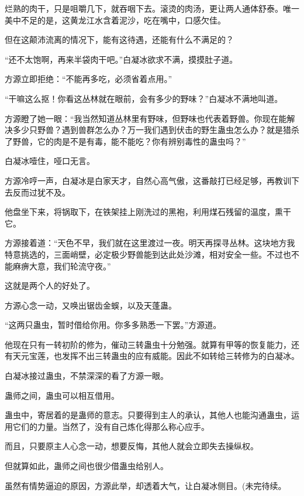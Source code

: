 \begin{this_body}
烂熟的肉干，只是咀嚼几下，就吞咽下去。滚烫的肉汤，更让两人通体舒泰。唯一美中不足的是，这黄龙江水含着泥沙，吃在嘴中，口感欠佳。

但在这颠沛流离的情况下，能有这待遇，还能有什么不满足的？

“还不太饱啊，再来半袋肉干吧。”白凝冰欲求不满，摸摸肚子道。

方源立即拒绝：“不能再多吃，必须省着点用。”

“干嘛这么抠！你看这丛林就在眼前，会有多少的野味？”白凝冰不满地叫道。

方源瞪了她一眼：“我当然知道丛林里有野味，但野味也代表着野兽。你现在能解决多少只野兽？遇到兽群怎么办？万一我们遇到伏击的野生蛊虫怎么办？就是猎杀了野兽，它的肉是不是有毒，能不能吃？你有辨别毒性的蛊虫吗？”

白凝冰噎住，哑口无言。

方源冷哼一声，白凝冰是白家天才，自然心高气傲，这番敲打已经足够，再教训下去反而过犹不及。

他盘坐下来，将锅取下，在铁架挂上刚洗过的黑袍，利用煤石残留的温度，熏干它。

方源接着道：“天色不早，我们就在这里渡过一夜。明天再探寻丛林。这块地方我特意挑选的，三面峭壁，必定极少野兽能到达此处沙滩，相对安全一些。不过也不能麻痹大意，我们轮流守夜。”

这就是两个人的好处了。

方源心念一动，又唤出锯齿金蜈，以及天蓬蛊。

“这两只蛊虫，暂时借给你用。你多多熟悉一下罢。”方源道。

他现在只有一转初阶的修为，催动三转蛊虫十分勉强。就算有甲等的恢复能力，还有天元宝莲，也发挥不出三转蛊虫的应有威能。因此不如转给三转修为的白凝冰。

白凝冰接过蛊虫，不禁深深的看了方源一眼。

蛊师之间，蛊虫可以相互借用。

蛊虫中，寄居着的是蛊师的意志。只要得到主人的承认，其他人也能沟通蛊虫，运用它们的力量。当然了，没有自己炼化得那么称心应手。

而且，只要原主人心念一动，想要反悔，其他人就会立即失去操纵权。

但就算如此，蛊师之间也很少借蛊虫给别人。

虽然有情势逼迫的原因，方源此举，却透着大气，让白凝冰侧目。(未完待续。

\end{this_body}

